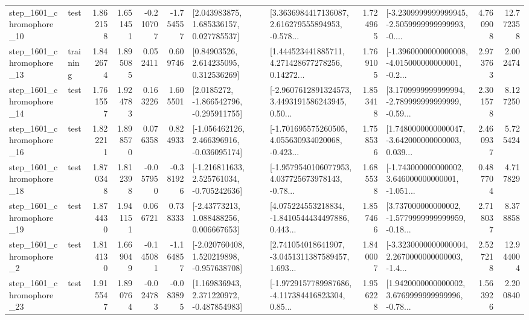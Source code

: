 \begin{tabular}{llrrrrllrlrr}
 step\_1601\_chromophore\_10 &      test &      1.862158 &    1.651451 &     -0.210707 & -1.754557 &     [2.043983875, 1.685336157, 0.027785537] &  [3.3636984417136087, 2.616279555894953, -0.578... &       1.724965 &  [-3.2309999999999945, -2.5059999999999993, -0.... &            4.760908 &         12.772358 \\
 step\_1601\_chromophore\_13 &  training &      1.842674 &    1.895085 &      0.052411 &  0.609746 &      [0.84903526, 2.614235095, 0.312536269] &  [1.444523441885711, 4.271428677278256, 0.14272... &       1.769105 &  [-1.3960000000000008, -4.015000000000001, -0.2... &            2.973763 &          2.002474 \\
 step\_1601\_chromophore\_14 &      test &      1.761557 &    1.924783 &      0.163226 &  1.605501 &     [2.0185272, -1.866542796, -0.295911755] &  [-2.9607612891324573, 3.4493191586243945, 0.50... &       1.853418 &  [3.1709999999999994, -2.789999999999999, -0.59... &            2.301578 &          8.127250 \\
 step\_1601\_chromophore\_16 &      test &      1.822211 &    1.898570 &      0.076358 &  0.824933 &   [-1.056462126, 2.466396916, -0.036095174] &  [-1.701695575260505, 4.055630934020068, -0.423... &       1.758536 &  [1.7480000000000047, -3.642000000000003, 0.039... &            2.460937 &          5.725424 \\
 step\_1601\_chromophore\_18 &      test &      1.870348 &    1.812398 &     -0.057950 & -0.381926 &   [-1.216811633, 2.525761034, -0.705242636] &  [-1.9579540106077953, 4.037725673978143, -0.78... &       1.685538 &  [-1.743000000000002, 3.646000000000001, -1.051... &            0.487704 &          4.717829 \\
 step\_1601\_chromophore\_19 &      test &      1.874430 &    1.941151 &      0.066721 &  0.738333 &     [-2.43773213, 1.088488256, 0.006667653] &  [4.075224553218834, -1.8410544434497886, 0.443... &       1.857466 &  [3.737000000000002, -1.5779999999999959, -0.18... &            2.718037 &          8.378858 \\
  step\_1601\_chromophore\_2 &      test &      1.814130 &    1.669049 &     -0.145081 & -1.164857 &   [-2.020760408, 1.520219898, -0.957638708] &  [2.741054018641907, -3.0451311387589457, 1.693... &       1.840007 &  [-3.3230000000000004, 2.2670000000000003, -1.4... &            2.527218 &         12.944004 \\
 step\_1601\_chromophore\_23 &      test &      1.915547 &    1.890764 &     -0.024783 & -0.083895 &    [1.169836943, 2.371220972, -0.487854983] &  [-1.9729157789987686, -4.117384416823304, 0.85... &       1.956228 &  [1.9420000000000002, 3.6769999999999996, -0.78... &            1.563926 &          2.200840 \\

\end{tabular}
